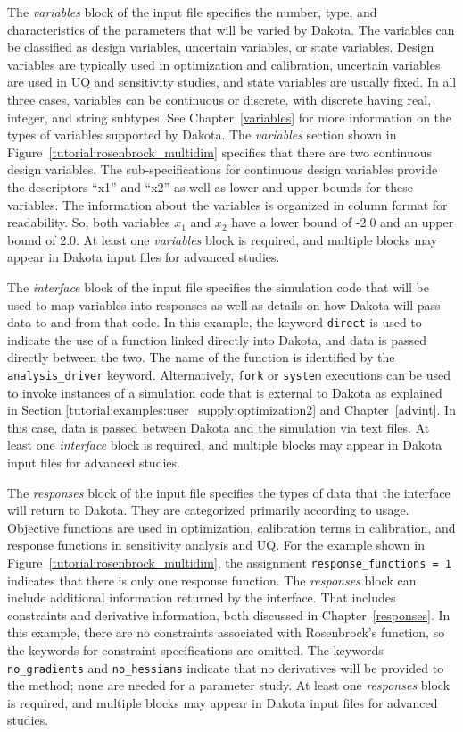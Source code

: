 The \emph{variables} block of the input file specifies the number,
type, and characteristics of the parameters that will be varied by
Dakota. The variables can be classified as design variables, uncertain
variables, or state variables.  Design variables are typically used in
optimization and calibration, uncertain variables are used in UQ and
sensitivity studies, and state variables are usually fixed.  In all
three cases, variables can be continuous or discrete, with discrete
having real, integer, and string subtypes. See Chapter~\ref{variables}
for more information on the types of variables supported by
Dakota. The \emph{variables} section shown in
Figure~\ref{tutorial:rosenbrock_multidim} specifies that there are two
continuous design variables. The sub-specifications for continuous
design variables provide the descriptors ``x1'' and ``x2'' as well as
lower and upper bounds for these variables. The information about the
variables is organized in column format for readability. So, both
variables $x_1$ and $x_2$ have a lower bound of -2.0 and an upper
bound of 2.0. At least one \emph{variables} block is required, and
multiple blocks may appear in Dakota input files for advanced studies.

The \emph{interface} block of the input file specifies the simulation
code that will be used to map variables into responses as well as
details on how Dakota will pass data to and from that code.  In this
example, the keyword \texttt{direct} is used to indicate the use of a
function linked directly into Dakota, and data is passed directly
between the two.  The name of the function is identified by the
\texttt{analysis\_driver} keyword.  Alternatively, \texttt{fork} or
\texttt{system} executions can be used to invoke instances of a
simulation code that is external to Dakota as explained in Section
\ref{tutorial:examples:user_supply:optimization2} and
Chapter~\ref{advint}.  In this case, data is passed between Dakota and
the simulation via text files. At least one \emph{interface} block is
required, and multiple blocks may appear in Dakota input files for
advanced studies.

The \emph{responses} block of the input file specifies the types of
data that the interface will return to Dakota.  They are categorized
primarily according to usage.  Objective functions are used in
optimization, calibration terms in calibration, and response functions
in sensitivity analysis and UQ. For the example shown in
Figure~\ref{tutorial:rosenbrock_multidim}, the assignment
\texttt{response\_functions = 1} indicates that there is only one
response function. The \emph{responses} block can include additional
information returned by the interface.  That includes constraints and
derivative information, both discussed in Chapter~\ref{responses}.  In
this example, there are no constraints associated with Rosenbrock's
function, so the keywords for constraint specifications are
omitted. The keywords \texttt{no\_gradients} and \texttt{no\_hessians}
indicate that no derivatives will be provided to the method; none are
needed for a parameter study.  At least one \emph{responses} block is
required, and multiple blocks may appear in Dakota input files for
advanced studies.

